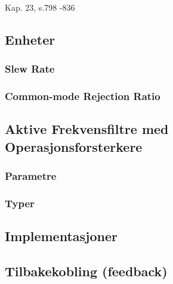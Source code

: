 Kap. 23, s.798 -836

\subsection{Enheter}
  \subsubsection{Slew Rate}
    
  \subsubsection{Common-mode Rejection Ratio}
    
\subsection{Aktive Frekvensfiltre med Operasjonsforsterkere}
  
  \subsubsection{Parametre}
    
  \subsubsection{Typer}
    
\subsection{Implementasjoner}
  
\subsection{Tilbakekobling (feedback)}
  
